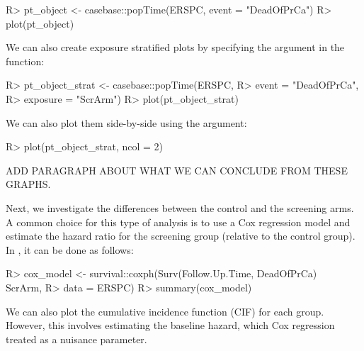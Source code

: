 \documentclass[
]{jss}
\begin{document}
\begin{CodeChunk}

\begin{CodeInput}
R> pt_object <- casebase::popTime(ERSPC, event = "DeadOfPrCa")
R> plot(pt_object)
\end{CodeInput}
\end{CodeChunk}

We can also create exposure stratified plots by specifying the
 argument in the  function:

\begin{CodeChunk}

\begin{CodeInput}
R> pt_object_strat <- casebase::popTime(ERSPC, 
R>                                      event = "DeadOfPrCa", 
R>                                      exposure = "ScrArm")
R> plot(pt_object_strat)
\end{CodeInput}
\end{CodeChunk}

We can also plot them side-by-side using the  argument:

\begin{CodeChunk}

\begin{CodeInput}
R> plot(pt_object_strat, ncol = 2)
\end{CodeInput}
\end{CodeChunk}

ADD PARAGRAPH ABOUT WHAT WE CAN CONCLUDE FROM THESE GRAPHS.

Next, we investigate the differences between the control and the
screening arms. A common choice for this type of analysis is to use a
Cox regression model and estimate the hazard ratio for the screening
group (relative to the control group). In , it can be done
as follows:

\begin{CodeChunk}

\begin{CodeInput}
R> cox_model <- survival::coxph(Surv(Follow.Up.Time, DeadOfPrCa) ~ ScrArm, 
R>                              data = ERSPC)
R> summary(cox_model)
\end{CodeInput}
\end{CodeChunk}

We can also plot the cumulative incidence function (CIF) for each group.
However, this involves estimating the baseline hazard, which Cox
regression treated as a nuisance parameter.
\end{document}
